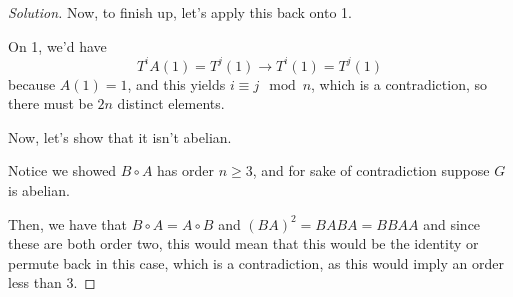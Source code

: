 \documentclass[11pt]{article}
\newcommand{\1}{\mathbf{1}}
\theoremstyle{definition}
\newenvironment{solution}{\begin{proof}[Solution]}{\end{proof}}
\begin{document}
\begin{solution}
Now, to finish up, let's apply this back onto 1.
\par On 1, we'd have $$T^{i} A(1) = T^{j} (1)\rightarrow T^{i} (1) = T^{j}(1)$$ because
$A(1) = 1$, and this yields $i \equiv j \mod n$, which is a contradiction, so there must
be $2n$ distinct elements.
\par Now, let's show that it isn't abelian.
\par Notice we showed $B \circ A$ has order $n \ge 3$, and for sake of contradiction suppose
$G$ is abelian.
\par Then, we have that $B \circ A = A \circ B$ and $(BA)^2 = BABA = BB AA$ and since these
are both order two, this would mean that this would be the identity or permute back in
this case, which is a contradiction, as this would imply an order less than 3.
\end{solution}
\end{document}
